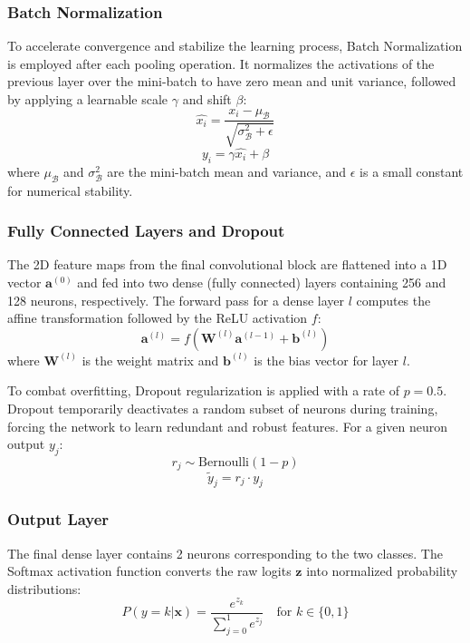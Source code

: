 \documentclass[conference]{IEEEtran}
\begin{document}
\subsubsection{Batch Normalization}
To accelerate convergence and stabilize the learning process, Batch Normalization is employed after each pooling operation. It normalizes the activations of the previous layer over the mini-batch to have zero mean and unit variance, followed by applying a learnable scale $\gamma$ and shift $\beta$:
\begin{equation}
    \hat{x_i} = \frac{x_i - \mu_{\mathcal{B}}}{\sqrt{\sigma_{\mathcal{B}}^2 + \epsilon}}
\end{equation}
\begin{equation}
    y_i = \gamma \hat{x_i} + \beta
\end{equation}
where $\mu_{\mathcal{B}}$ and $\sigma_{\mathcal{B}}^2$ are the mini-batch mean and variance, and $\epsilon$ is a small constant for numerical stability.

\subsubsection{Fully Connected Layers and Dropout}
The 2D feature maps from the final convolutional block are flattened into a 1D vector $\mathbf{a}^{(0)}$ and fed into two dense (fully connected) layers containing 256 and 128 neurons, respectively. The forward pass for a dense layer $l$ computes the affine transformation followed by the ReLU activation $f$:
\begin{equation}
    \mathbf{a}^{(l)} = f(\mathbf{W}^{(l)} \mathbf{a}^{(l-1)} + \mathbf{b}^{(l)})
\end{equation}
where $\mathbf{W}^{(l)}$ is the weight matrix and $\mathbf{b}^{(l)}$ is the bias vector for layer $l$. 

To combat overfitting, Dropout regularization is applied with a rate of $p=0.5$. Dropout temporarily deactivates a random subset of neurons during training, forcing the network to learn redundant and robust features. For a given neuron output $y_j$:
\begin{equation}
    r_j \sim \text{Bernoulli}(1-p)
\end{equation}
\begin{equation}
    \tilde{y}_j = r_j \cdot y_j
\end{equation}

\subsubsection{Output Layer}
The final dense layer contains 2 neurons corresponding to the two classes. The Softmax activation function converts the raw logits $\mathbf{z}$ into normalized probability distributions:
\begin{equation}
    P(y = k | \mathbf{x}) = \frac{e^{z_k}}{\sum_{j=0}^{1} e^{z_j}} \quad \text{for } k \in \{0, 1\}
\end{equation}
\end{document}
